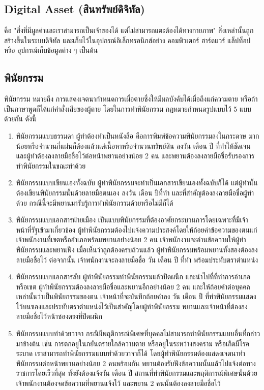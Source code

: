 \documentclass[12pt,oneside,openright,a4paper]{cpe-thai-project}
\begin{document}
\subsection{Digital Asset (สินทรัพย์ดิจิทัล)  \cite{digital-asset}}
\tab คือ "สิ่งที่มีมูลค่าและเราสามารถเป็นเจ้าของได้ แต่ไม่สามารถแตะต้องได้ทางกายภาพ" สิ่งเหล่านั้นถูกสร้างขึ้นในระบบดิจิทัล และเก็บไว้ในอุปกรณ์อิเล็กทรอนิกส์อย่าง คอมพิวเตอร์ ฮาร์ดแวร์ แล็ปท็อป หรือ อุปกรณ์เก็บข้อมูลต่าง ๆ เป็นต้น

\subsection{พินัยกรรม  \cite{will}}
\tab พินัยกรรม หมายถึง การแสดงเจตนากำหนดการเผื่อตายซึ่งให้มีผลบังคับได้เมื่อถึงแก่ความตาย หรือถ้าเป็นภาษาพูดก็ได้แก่คำสั่งเสียของผู้ตาย โดยในการทำพินัยกรรม กฎหมายกำหนดรูปแบบไว้ 5 แบบด้วยกัน ดังนี้
\begin{enumerate}[label=\thesubsection.\arabic*,leftmargin=0pt,itemindent=2.5cm]
\item พินัยกรรมแบบธรรมดา ผู้ทำต้องทำเป็นหนังสือ คือการพิมพ์ข้อความพินัยกรรมลงในกระดาษ มากน้อยหรือจำนวนกี่แผ่นก็ต้องแล้วแต่เนื้อหาหรือจำนวนทรัพย์สิน   ลงวัน เดือน ปี ที่ทำให้ชัดเจน และผู้ทำต้องลงลายมือชื่อไว้ต่อหน้าพยานอย่างน้อย 2 คน และพยานต้องลงลายมือชื่อรับรองการทำพินัยกรรมในขณะทำด้วย
\item พินัยกรรมแบบเขียนเองทั้งฉบับ ผู้ทำพินัยกรรมจะทำเป็นเอกสารเขียนเองทั้งฉบับก็ได้ แต่ผู้ทำนั้นต้องเขียนพินัยกรรมนั้นด้วยลายมือตนเอง   ลงวัน เดือน ปีที่ทำ และที่สำคัญต้องลงลายมือชื่อผู้ทำด้วย กรณีนี้จะมีพยานมารับรู้การทำพินัยกรรมด้วยหรือไม่มีก็ได้
\item พินัยกรรมแบบเอกสารฝ่ายเมือง เป็นแบบพินัยกรรมที่ต้องอาศัยกระบวนการโดยเฉพาะที่มีเจ้าหน้าที่รัฐเข้ามาเกี่ยวข้อง   ผู้ทำพินัยกรรมต้องไปแจ้งความประสงค์โดยให้ถ้อยคำข้อความของตนแก่เจ้าพนักงานที่เขตหรืออำเภอพร้อมพยานอย่างน้อย 2 คน   เจ้าพนักงานจะอ่านข้อความให้ผู้ทำพินัยกรรมและพยานฟัง เมื่อเห็นว่าถูกต้องครบถ้วนแล้ว ผู้ทำพินัยกรรมพร้อมพยานทั้งสองต้องลงลายมือชื่อไว้   ต่อจากนั้น เจ้าพนักงานจะลงลายมือชื่อ วัน เดือน ปี ที่ทำ พร้อมประทับตราตำแหน่ง
\item พินัยกรรมแบบเอกสารลับ ผู้ทำพินัยกรรมทำพินัยกรรมแล้วปิดผนึก และนำไปที่ที่ทำการอำเภอหรือเขต   ผู้ทำพินัยกรรมต้องลงลายมือชื่อและพยานอีกอย่างน้อย 2 คน และให้ถ้อยคำต่อบุคคลเหล่านั้นว่าเป็นพินัยกรรมของตน   เจ้าหน้าที่จะบันทึกถ้อยคำลง วัน เดือน ปี ที่ทำพินัยกรรมแสดงไว้บนซองและประทับตราตำแหน่งไว้เป็นสำคัญโดยผู้ทำพินัยกรรม   พยานและเจ้าหน้าที่ต้องลงลายมือชื่อไว้หน้าซองตรงที่ปิดผนึก
\item พินัยกรรมแบบทำด้วยวาจา กรณีมีพฤติการณ์พิเศษที่บุคคลไม่สามารถทำพินัยกรรมแบบอื่นที่กล่าวมาข้างต้น เช่น การตกอยู่ในภยันตรายใกล้ความตาย หรืออยู่ในระหว่างสงคราม หรือเกิดมีโรคระบาด   เราสามารถทำพินัยกรรมแบบทำด้วยวาจาก็ได้ โดยผู้ทำพินัยกรรมต้องแสดงเจตนาทำพินัยกรรมต่อหน้าพยานอย่างน้อย 2 คนพร้อมกัน   พยานต้องรับฟังข้อความนั้นแล้วไปแจ้งต่อทางราชการโดยเร็วที่สุด ทั้งยังต้องแจ้งวัน เดือน ปี สถานที่ทำพินัยกรรมและพฤติการณ์พิเศษนั้นด้วย   เจ้าพนักงานต้องจดข้อความที่พยานแจ้งไว้ และพยาน 2 คนนั้นต้องลงลายมือชื่อไว้
\end{enumerate}
\end{document}
